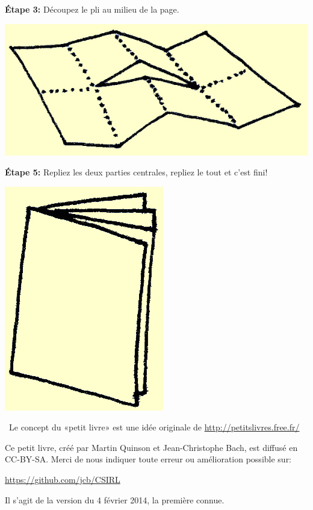 \documentclass[a4paper,12pt]{article}
\begin{document}
\begin{minipage}[b]{.45\linewidth}
\end{minipage}\hfill\begin{minipage}[b]{.45\linewidth}
\noindent\textbf{Étape 3:} Découpez le pli au milieu de la page.

\bigskip
\bigskip \centerline{\includegraphics{img/ptitlivre-etape3.jpg}}
  
\bigskip
\bigskip
\bigskip
\bigskip
\noindent\textbf{Étape 5:} Repliez les deux parties centrales, repliez
le tout et c'est fini!

  \centerline{\includegraphics{img/ptitlivre-etape5.jpg}}

\bigskip
\end{minipage}

\bigskip~\hfill{\small Le concept du «petit livre» est une idée
  originale de {\color{blue}\url{http://petitslivres.free.fr/}}}

\bigskip \bigskip \bigskip %
Ce petit livre, créé par Martin Quinson et Jean-Christophe Bach, est
diffusé en CC-BY-SA. Merci de nous indiquer toute erreur ou
amélioration possible sur:

\centerline{\color{blue}\url{https://github.com/jcb/CSIRL}}

\bigskip%
Il s'agit de la version du 4 février 2014, la première connue.
\end{document}
